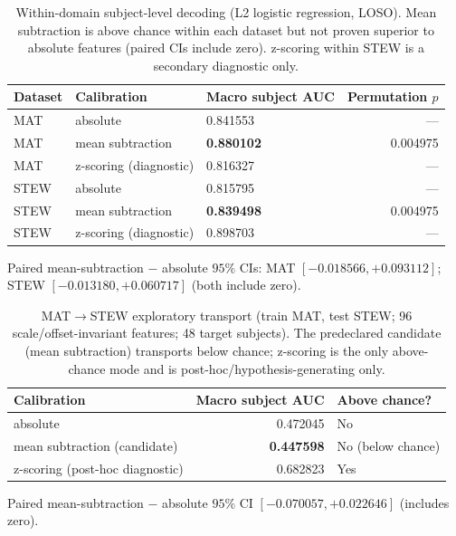 \documentclass[11pt]{article}
\begin{document}
\begin{table}[ht]
\centering
\caption{Within-domain subject-level decoding (L2 logistic regression, LOSO).
Mean subtraction is above chance within each dataset but not proven superior to
absolute features (paired CIs include zero). z-scoring within STEW is a
secondary diagnostic only.}
\label{tab:within}
\small
\begin{tabular}{lllr}
\toprule
Dataset & Calibration & Macro subject AUC & Permutation $p$ \\
\midrule
MAT  & absolute              & 0.841553 & --- \\
MAT  & mean subtraction      & \textbf{0.880102} & 0.004975 \\
MAT  & z-scoring (diagnostic)& 0.816327 & --- \\
STEW & absolute              & 0.815795 & --- \\
STEW & mean subtraction      & \textbf{0.839498} & 0.004975 \\
STEW & z-scoring (diagnostic)& 0.898703 & --- \\
\bottomrule
\end{tabular}
\par\vspace{2pt}
\footnotesize Paired mean-subtraction $-$ absolute $95\%$ CIs:
MAT $[-0.018566, +0.093112]$; STEW $[-0.013180, +0.060717]$ (both include zero).
\end{table}

\begin{table}[ht]
\centering
\caption{MAT$\rightarrow$STEW exploratory transport (train MAT, test STEW; 96
scale/offset-invariant features; 48 target subjects). The predeclared candidate
(mean subtraction) transports below chance; z-scoring is the only above-chance
mode and is post-hoc/hypothesis-generating only.}
\label{tab:transport}
\small
\begin{tabular}{lrl}
\toprule
Calibration & Macro subject AUC & Above chance? \\
\midrule
absolute               & 0.472045 & No \\
mean subtraction (candidate) & \textbf{0.447598} & No (below chance) \\
z-scoring (post-hoc diagnostic) & 0.682823 & Yes \\
\bottomrule
\end{tabular}
\par\vspace{2pt}
\footnotesize Paired mean-subtraction $-$ absolute $95\%$ CI
$[-0.070057, +0.022646]$ (includes zero).
\end{table}
\end{document}

